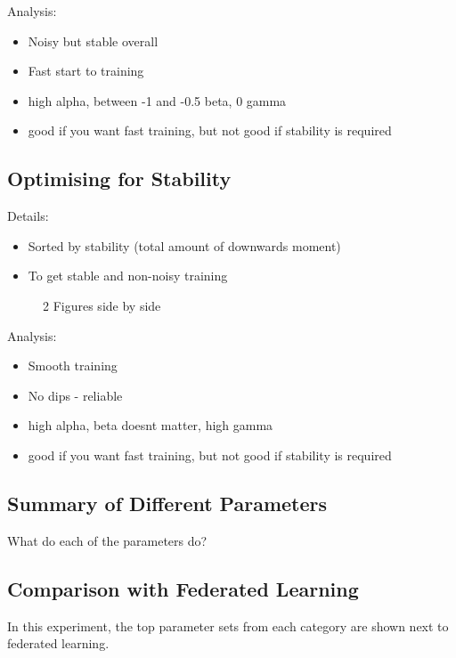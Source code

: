 Analysis:
\begin{itemize}
	\item Noisy but stable overall
	\item Fast start to training
	\item high alpha, between -1 and -0.5 beta, 0 gamma
	\item good if you want fast training, but not good if stability is required
\end{itemize}

\subsection{Optimising for Stability}
Details:
\begin{itemize}
	\item Sorted by stability (total amount of downwards moment)
	\item To get stable and non-noisy training
\end{itemize}

\begin{figure}
	\centering
	\qquad
	\caption{2 Figures side by side}%
	\label{fig:ex_stab}%
\end{figure}

Analysis:
\begin{itemize}
	\item Smooth training
	\item No dips - reliable
	\item high alpha, beta doesnt matter, high gamma
	\item good if you want fast training, but not good if stability is required
\end{itemize}

\subsection{Summary of Different Parameters}
What do each of the parameters do?

\subsection{Comparison with Federated Learning}
In this experiment, the top parameter sets from each category are shown next to federated learning.